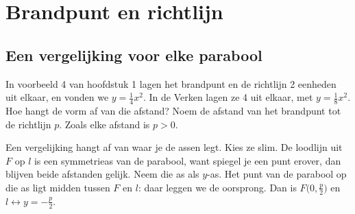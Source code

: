 \section{Brandpunt en richtlijn}

\subsection{Een vergelijking voor elke parabool}

In voorbeeld 4 van hoofdstuk 1 lagen het brandpunt en de richtlijn 2 eenheden uit elkaar, en vonden we $y = \tfrac14 x^2$. In de Verken lagen ze 4 uit elkaar, met $y = \tfrac18 x^2$. Hoe hangt de vorm af van die afstand? Noem de afstand van het brandpunt tot de richtlijn $p$. Zoals elke afstand is $p > 0$.

Een vergelijking hangt af van waar je de assen legt. Kies ze slim. De loodlijn uit $F$ op $l$ is een symmetrieas van de parabool, want spiegel je een punt erover, dan blijven beide afstanden gelijk. Neem die as als $y$-as. Het punt van de parabool op die as ligt midden tussen $F$ en $l$: daar leggen we de oorsprong. Dan is $F\bigl(0, \tfrac p2\bigr)$ en $l \leftrightarrow y = -\tfrac p2$.

